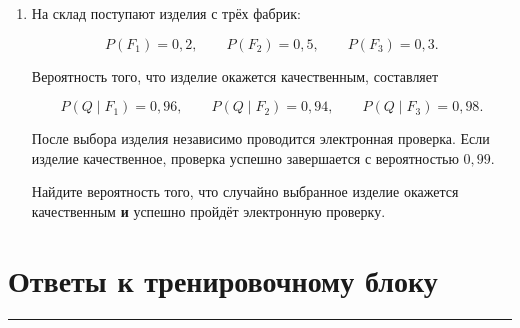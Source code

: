 \documentclass[a4paper,12pt]{article}
\newcommand{\accentline}{%
    \vspace{0.3em}
    {\color{accent}\rule{\linewidth}{0.7pt}}
    \vspace{0.5em}
}
\begin{document}
\begin{enumerate}[resume]

\item
На склад поступают изделия с трёх фабрик:

\[
P(F_1)=0,2,\qquad
P(F_2)=0,5,\qquad
P(F_3)=0,3.
\]

Вероятность того, что изделие окажется качественным, составляет

\[
P(Q\mid F_1)=0,96,
\qquad
P(Q\mid F_2)=0,94,
\qquad
P(Q\mid F_3)=0,98.
\]

После выбора изделия независимо проводится электронная проверка.
Если изделие качественное, проверка успешно завершается с вероятностью
$0,99$.

Найдите вероятность того, что случайно выбранное изделие окажется
качественным \textbf{и} успешно пройдёт электронную проверку.

\end{enumerate}


\clearpage

\section*{\color{darkaccent}Ответы к тренировочному блоку}
\accentline

\renewcommand{\arraystretch}{1.45}
\end{document}
